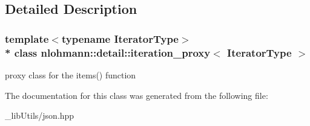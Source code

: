 \subsection{Detailed Description}
\subsubsection*{template$<$typename Iterator\+Type$>$\\*
class nlohmann\+::detail\+::iteration\+\_\+proxy$<$ Iterator\+Type $>$}

proxy class for the items() function 

The documentation for this class was generated from the following file\+:\begin{DoxyCompactItemize}
\item 
\+\_\+lib\+Utils/json.\+hpp\end{DoxyCompactItemize}
